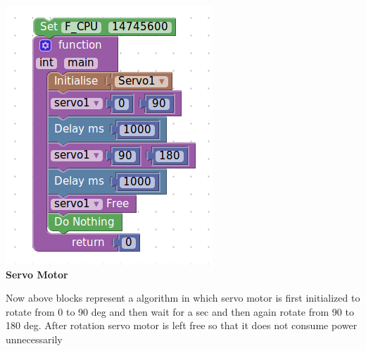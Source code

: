 \documentclass[a4paper,12pt,oneside]{book}
\begin{document}
\begin{center}
    \includegraphics[scale =0.6]{servosam}\\[.3in]
    \textbf{Servo Motor}\\[1.3in]
    \end{center}
    \vspace{-2cm}
    Now above blocks represent a algorithm in which servo motor is first initialized to rotate from 0 to 90 deg and then wait for a sec and then again rotate from 90 to 180 deg. After rotation servo motor is left free so that it does not consume power unnecessarily 
\end{document}
